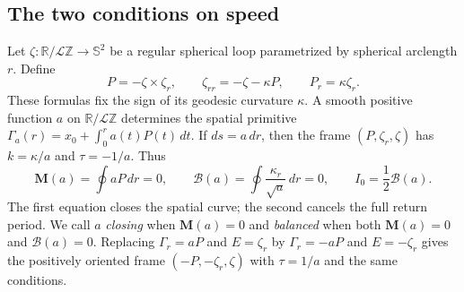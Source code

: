 \documentclass[11pt]{amsart}
\theoremstyle{definition}
\theoremstyle{remark}
\newcommand{\R}{\mathbb R}\newcommand{\Sph}{\mathbb S}
\numberwithin{equation}{section}
\begin{document}
\subsection{The two conditions on speed}
Let $\zeta:\R/\mathcal L\mathbb Z\to\Sph^2$ be a regular spherical loop
parametrized by spherical arclength $r$. Define
\begin{equation}\label{eq:structural-normal-frame}
 P=-\zeta\times\zeta_r,\qquad
 \zeta_{rr}=-\zeta-\kappa P,\qquad P_r=\kappa\zeta_r.
\end{equation}
These formulas fix the sign of its geodesic curvature $\kappa$.
A smooth positive function $a$ on $\R/\mathcal L\mathbb Z$ determines
the spatial primitive
$\Gamma_a(r)=x_0+\int_0^r a(t)P(t)\,dt$. If $ds=a\,dr$,
then the frame $(P,\zeta_r,\zeta)$ has $k=\kappa/a$ and $\tau=-1/a$.
Thus
\begin{equation}\label{eq:structural-moments}
 \mathbf M(a)=\oint aP\,dr=0,\qquad
 \mathscr B(a)=\oint\frac{\kappa_r}{\sqrt a}\,dr=0,
 \qquad I_0=\frac12\mathscr B(a).
\end{equation}
The first equation closes the spatial curve; the second cancels the full
return period. We call $a$ \emph{closing} when $\mathbf M(a)=0$ and
\emph{balanced} when both $\mathbf M(a)=0$ and $\mathscr B(a)=0$.
Replacing $\Gamma_r=aP$ and $E=\zeta_r$ by
$\Gamma_r=-aP$ and $E=-\zeta_r$ gives the positively oriented frame
$(-P,-\zeta_r,\zeta)$ with $\tau=1/a$ and the same conditions.
\end{document}
